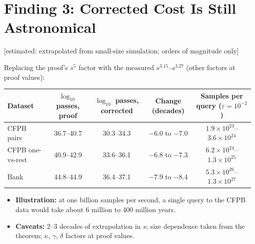 \documentclass[10pt]{article}
\newcommand{\evlabel}[1]{\textsf{\small[#1]}}
\newenvironment{sectionblock}
{%
    \par
    \vspace{2pt}
    \noindent
    \begin{minipage}{\textwidth}
}
{%
    \end{minipage}
    \par
    \vspace{5pt}
}
\begin{document}
\begin{sectionblock}

\section{Finding 3: Corrected Cost Is Still Astronomical}
\label{sec:f3}

\evlabel{estimated: extrapolated from small-size simulation; orders of magnitude only}

\vspace{2pt}
Replacing the proof's $s^{5}$ factor with the measured $s^{3.15}$--$s^{3.27}$ (other factors at proof values):

\vspace{2pt}
\begin{center}
\small
\begin{tabularx}{\textwidth}{@{}lCCCC@{}}
\toprule
\textbf{Dataset} & \textbf{$\log_{10}$ passes, proof} & \textbf{$\log_{10}$ passes, corrected} & \textbf{Change (decades)} & \textbf{Samples per query ($\varepsilon=10^{-2}$)} \\
\midrule
CFPB pairs & 36.7--40.7 & 30.3--34.3 & $-6.0$ to $-7.0$ & $1.9\times10^{23}$--$3.6\times10^{24}$ \\
CFPB one-vs-rest & 40.9--42.9 & 33.6--36.1 & $-6.8$ to $-7.3$ & $6.2\times10^{24}$--$1.3\times10^{25}$ \\
Bank & 44.8--44.9 & 36.4--37.1 & $-7.9$ to $-8.4$ & $5.3\times10^{26}$--$1.3\times10^{27}$ \\
\bottomrule
\end{tabularx}
\end{center}

\begin{itemize}
    \item \textbf{Illustration:} at one billion samples per second, a single query to the CFPB data would take about 6 million to 400 million years.
    \item \textbf{Caveats:} 2--3 decades of extrapolation in $s$; size dependence taken from the theorem; $\kappa$, $\gamma$, $\delta$ factors at proof values.
\end{itemize}

\end{sectionblock}
\end{document}
